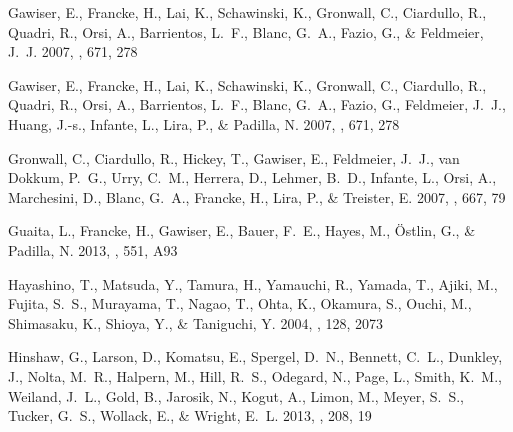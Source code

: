\documentclass{emulateapj}
\begin{document}
\begin{thebibliography}{36}
{Gawiser}, E., {Francke}, H., {Lai}, K., {Schawinski}, K., {Gronwall}, C.,
  {Ciardullo}, R., {Quadri}, R., {Orsi}, A., {Barrientos}, L.~F., {Blanc},
  G.~A., {Fazio}, G., \& {Feldmeier}, J.~J. 2007{}, \apj, 671, 278

{Gawiser}, E., {Francke}, H., {Lai}, K., {Schawinski}, K., {Gronwall}, C.,
  {Ciardullo}, R., {Quadri}, R., {Orsi}, A., {Barrientos}, L.~F., {Blanc},
  G.~A., {Fazio}, G., {Feldmeier}, J.~J., {Huang}, J.-s., {Infante}, L.,
  {Lira}, P., \& {Padilla}, N. 2007{}, \apj, 671, 278

{Gronwall}, C., {Ciardullo}, R., {Hickey}, T., {Gawiser}, E., {Feldmeier},
  J.~J., {van Dokkum}, P.~G., {Urry}, C.~M., {Herrera}, D., {Lehmer}, B.~D.,
  {Infante}, L., {Orsi}, A., {Marchesini}, D., {Blanc}, G.~A., {Francke}, H.,
  {Lira}, P., \& {Treister}, E. 2007, \apj, 667, 79

{Guaita}, L., {Francke}, H., {Gawiser}, E., {Bauer}, F.~E., {Hayes}, M.,
  {{\"O}stlin}, G., \& {Padilla}, N. 2013, \aap, 551, A93

{Hayashino}, T., {Matsuda}, Y., {Tamura}, H., {Yamauchi}, R., {Yamada}, T.,
  {Ajiki}, M., {Fujita}, S.~S., {Murayama}, T., {Nagao}, T., {Ohta}, K.,
  {Okamura}, S., {Ouchi}, M., {Shimasaku}, K., {Shioya}, Y., \& {Taniguchi}, Y.
  2004, \aj, 128, 2073

{Hinshaw}, G., {Larson}, D., {Komatsu}, E., {Spergel}, D.~N., {Bennett}, C.~L.,
  {Dunkley}, J., {Nolta}, M.~R., {Halpern}, M., {Hill}, R.~S., {Odegard}, N.,
  {Page}, L., {Smith}, K.~M., {Weiland}, J.~L., {Gold}, B., {Jarosik}, N.,
  {Kogut}, A., {Limon}, M., {Meyer}, S.~S., {Tucker}, G.~S., {Wollack}, E., \&
  {Wright}, E.~L. 2013, \apjs, 208, 19


\end{thebibliography}
\end{document}
